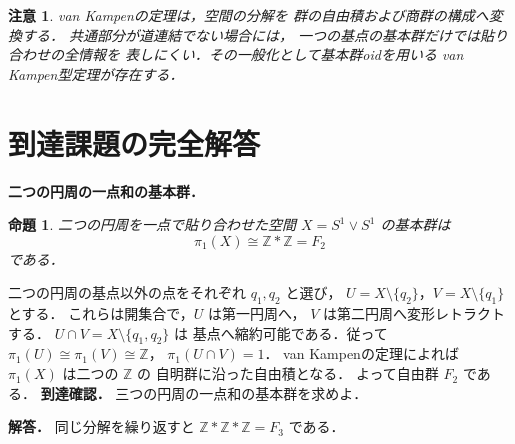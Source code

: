 \documentclass[a5paper,10pt,onecolumn]{jsarticle}
\makeatletter
\theoremstyle{mathnotetheorem}
\newtheorem{proposition}[theorem]{命題}
\newtheorem{remark}[theorem]{注意}
\renewcommand{\proofname}{証明}
\renewenvironment{proof}[1][\proofname]{%
  \par\pushQED{\qed}\normalfont\topsep4\p@\@plus2\p@\relax
  \trivlist\item[\hskip\labelsep\bfseries #1]\ignorespaces
}{\popQED\endtrivlist\@endpefalse}
\makeatother
\begin{document}
\begin{remark}
van Kampenの定理は，空間の分解を
群の自由積および商群の構成へ変換する．
共通部分が道連結でない場合には，
一つの基点の基本群だけでは貼り合わせの全情報を
表しにくい．その一般化として基本群oidを用いる
van Kampen型定理が存在する．
\end{remark}

\section{到達課題の完全解答}
\noindent\textbf{二つの円周の一点和の基本群．}
\begin{proposition}
二つの円周を一点で貼り合わせた空間
$X=S^1\vee S^1$ の基本群は
\[
\pi_1(X)\cong\mathbb Z*\mathbb Z=F_2
\]
である．
\end{proposition}
\begin{proof}
二つの円周の基点以外の点をそれぞれ $q_1,q_2$ と選び，
$U=X\setminus\{q_2\}$，$V=X\setminus\{q_1\}$ とする．
これらは開集合で，$U$ は第一円周へ，
$V$ は第二円周へ変形レトラクトする．
$U\cap V=X\setminus\{q_1,q_2\}$ は
基点へ縮約可能である．従って
$\pi_1(U)\cong\pi_1(V)\cong\mathbb Z$，
$\pi_1(U\cap V)=1$．
van Kampenの定理によれば
$\pi_1(X)$ は二つの $\mathbb Z$ の
自明群に沿った自由積となる．
よって自由群 $F_2$ である．
\end{proof}
\noindent\textbf{到達確認．}
三つの円周の一点和の基本群を求めよ．
\par\noindent\textbf{解答．}
同じ分解を繰り返すと
$\mathbb Z*\mathbb Z*\mathbb Z=F_3$ である．
\end{document}
